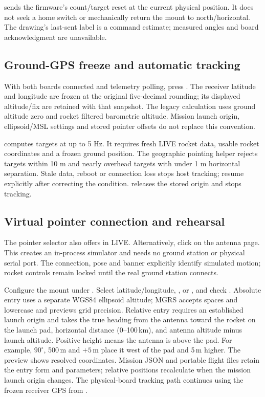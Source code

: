  sends the firmware's count/target reset at the current physical
position. It does not seek a home switch or mechanically return the mount to
north/horizontal. The drawing's last-sent label is a command estimate; measured
angles and board acknowledgment are unavailable.

\subsection{Ground-GPS freeze and automatic tracking}
With both boards connected and telemetry polling, press .
The receiver latitude and longitude are frozen at the original five-decimal
rounding; its displayed altitude/fix are retained with that snapshot. The legacy
calculation uses ground altitude zero and rocket filtered barometric altitude.
Mission launch origin, ellipsoid/MSL settings and stored pointer offsets do not
replace this convention.

 computes targets at up to 5 Hz. It requires fresh LIVE
rocket data, usable rocket coordinates and a frozen ground position. The
geographic pointing helper rejects targets within 10 m and nearly overhead
targets with under 1 m horizontal separation. Stale data, reboot or connection
loss stops host tracking; resume explicitly after correcting the condition.
 releases the stored origin and stops tracking.


\subsection{Virtual pointer connection and rehearsal}
The pointer selector also offers  in LIVE.
Alternatively, click  on the antenna page.
This creates an in-process simulator and needs no ground station or physical
serial port. The connection, pose and banner explicitly identify simulated
motion; rocket controls remain locked until the real ground station connects.

Configure the mount under . Select
latitude/longitude, , or , and check
. Absolute entry uses a separate WGS84
ellipsoid altitude; MGRS accepts spaces and lowercase and previews grid precision.
Relative entry requires an established launch origin and takes the true heading
from the antenna toward the rocket on the launch pad, horizontal distance
(0--100\,km), and antenna altitude minus launch altitude. Positive height means
the antenna is above the pad. For example, $90^\circ$, 500\,m and $+5$\,m place
it west of the pad and 5\,m higher. The preview shows resolved coordinates.
Mission JSON and portable flight files retain the entry form and parameters;
relative positions recalculate when the mission launch origin changes. The physical-board
tracking path continues using the frozen receiver GPS from .

